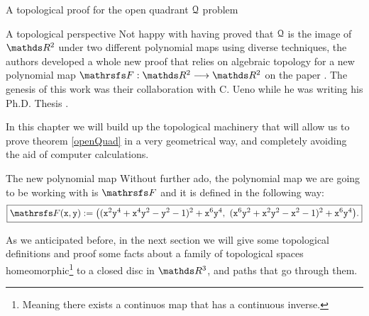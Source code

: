 \documentclass[11pt, a4paper, english, twoside, notitlepage, openright]{report}
\begin{document}
\begin{chapter}{A topological proof for the open quadrant $\mathcal{Q}$ problem}
\begin{section}{A topological perspective}
Not happy with having proved that $\mathcal{Q}$ is the image of $\R^2$ under two different polynomial maps using diverse techniques, the authors developed a whole new proof that relies on algebraic topology for a new polynomial map $\FFF: \R^2 \longrightarrow \R^2$ on the paper \cite{fgu}. The genesis of this work was their collaboration with C. Ueno while he was writing his Ph.D. Thesis \cite{u}.

In this chapter we will build up the topological machinery that will allow us to prove theorem \ref{openQuad} in a very geometrical way, and completely avoiding the aid of computer calculations.
\begin{subsection}{The new polynomial map}
Without further ado, the polynomial map we are going to be working with is $\FFF$ and it is defined in the following way:
\begin{equation*}
\boxed{
\FFF({\tt x}, {\tt y}) := \big(({\tt x}^2{\tt y}^4+{\tt x}^4{\tt y}^2-{\tt y}^2-1)^2+{\tt x}^6{\tt y}^4,\ ({\tt x}^6{\tt y}^2+{\tt x}^2{\tt y}^2-{\tt x}^2-1)^2+{\tt x}^6{\tt y}^4\big).
}
\end{equation*}

As we anticipated before, in the next section we will give some topological definitions and proof some facts about a family of topological spaces homeomorphic\footnote{Meaning there exists a continuos map that has a continuous inverse.} to a closed disc in $\R^3$, and paths that go through them.


\end{subsection}
\end{section}
\end{chapter}
\end{document}
